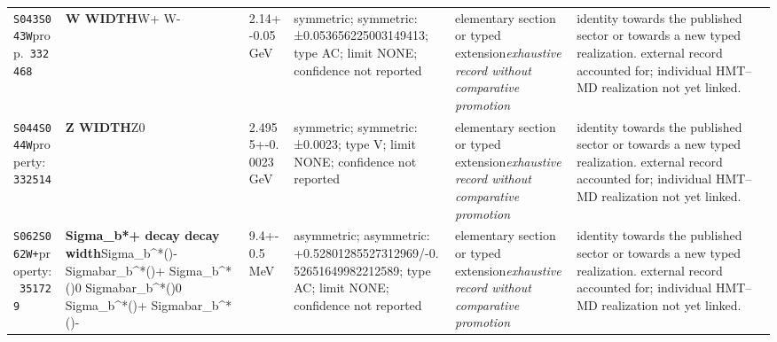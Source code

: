 \begin{landscape}
\begin{longtable}{L{1.85cm}L{4.45cm}L{2.35cm}L{4.05cm}L{3.35cm}L{7.15cm}}
\texttt{S043}\newline \texttt{S043W}\newline prop.\ \texttt{332468} & \textbf{W WIDTH}\newline W+ \textbar{}\allowbreak{} W- & 2.14+-0.05\,GeV & symmetric; symmetric: ±0.053656225003149413; type AC; limit NONE; confidence not reported & elementary section or typed extension\newline \emph{exhaustive record without comparative promotion} & identity towards the published sector or towards a new typed realization. external record accounted for; individual HMT--MD realization not yet linked. \\
\texttt{S044}\newline \texttt{S044W}\newline property:\ \texttt{332514} & \textbf{Z WIDTH}\newline Z0 & 2.4955+-0.0023\,GeV & symmetric; symmetric: ±0.0023; type V; limit NONE; confidence not reported & elementary section or typed extension\newline \emph{exhaustive record without comparative promotion} & identity towards the published sector or towards a new typed realization. external record accounted for; individual HMT--MD realization not yet linked. \\
\texttt{S062}\newline \texttt{S062W+}\newline property:\ \texttt{351729} & \textbf{Sigma\_\allowbreak{}b*+ decay decay width}\newline Sigma\_\allowbreak{}b\textasciicircum{}*()- \textbar{}\allowbreak{} Sigmabar\_\allowbreak{}b\textasciicircum{}*()+ \textbar{}\allowbreak{} Sigma\_\allowbreak{}b\textasciicircum{}*()0 \textbar{}\allowbreak{} Sigmabar\_\allowbreak{}b\textasciicircum{}*()0 \textbar{}\allowbreak{} Sigma\_\allowbreak{}b\textasciicircum{}*()+ \textbar{}\allowbreak{} Sigmabar\_\allowbreak{}b\textasciicircum{}*()- & 9.4+-0.5\,MeV & asymmetric; asymmetric: +0.52801285527312969/-0.52651649982212589; type AC; limit NONE; confidence not reported & elementary section or typed extension\newline \emph{exhaustive record without comparative promotion} & identity towards the published sector or towards a new typed realization. external record accounted for; individual HMT--MD realization not yet linked. \\

\end{longtable}
\end{landscape}
